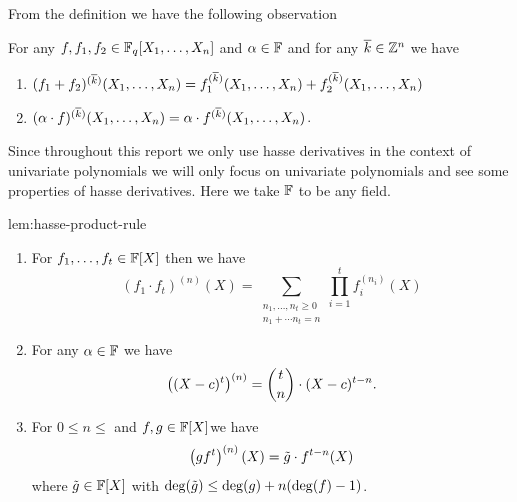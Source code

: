 From the definition we have the following observation
\begin{observation}
  For any $f,f_1,f_2\in\mathbb{F}_q[X_1,\dots, X_n]$ and $\alpha\in\mathbb{F}$ and for any $\overline{k}\in\mathbb{Z}^n$ we have\begin{enumerate}[label=(\roman*)]
    \item $(f_1+f_2)^{(\overline{k})}(X_1,\dots, X_n)=f_1^{(\overline{k})}(X_1,\dots, X_n)+f_2^{(\overline{k})}(X_1,\dots, X_n)$
    \item $(\alpha\cdot f)^{(\overline{k})}(X_1,\dots, X_n)=\alpha\cdot f^{(\overline{k})}(X_1,\dots, X_n)$.
  \end{enumerate}
\end{observation}
Since throughout this report we only use hasse derivatives in the context of univariate polynomials we will only focus on univariate polynomials and see some properties of hasse derivatives. Here we take $\mathbb{F}$ to be any field.
\begin{Lemma}{}{lem:hasse-product-rule}
  \begin{enumerate}[label=(\roman*)]
    \item For $f_1,\dots, f_t\in\mathbb{F}[X]$ then we have $$(f_1\cdot f_t)^{(n)}(X)=\sum_{\substack{n_1,\dots, n_t\geq 0\\ n_1+\cdots n_t=n}}\prod_{i=1}^tf_i^{(n_i)}(X)$$
    \item For any $\alpha\in\mathbb{F}$ we have $$\left((X-c)^t\right)^{(n)}=\binom{t}n\cdot (X-c)^{t-n}.$$
    \item For $0\leq n\leq $ and $f,g\in \mathbb{F}[X]$we have $$\left(gf^t\right)^{(n)}(X)=\tilde{g}\cdot f^{t-n}(X)$$ where $\tilde{g}\in\mathbb{F}[X]$ with $\deg(\tilde{g})\leq \deg(g)+n(\deg(f)-1)$.
  \end{enumerate}
\end{Lemma}
